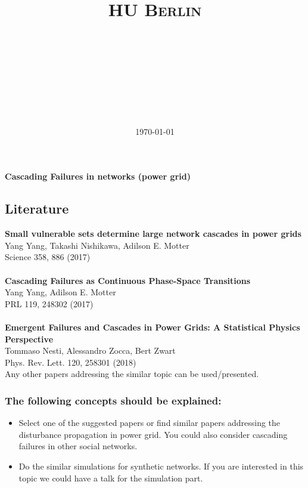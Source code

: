 \documentclass[a4paper,12pt]{article}
\title{
\vspace{2in}
\huge{\textsc{HU Berlin}\\\vspace{0.3cm}\hmwkClass}\\
\horrule{0.5pt} \\[0.4cm] %
\huge{\textmd{\textbf{\ \hmwkTitle}}}\\
\horrule{2pt} \\[0.5cm] %
\vspace{3in}
}
\author{\Large{\textbf{\hmwkAuthorName}}}
\date{\today} %
\newcommand{\hmwkTitle}{Cascading Failures in networks (power grid)} %
\newcommand{\hmwkDueDate}{} %
\begin{document}



\vspace*{1mm}
\begin{center}
    {\LARGE\textbf{\hmwkTitle}}\\
   \hmwkDueDate
\end{center}

\subsection*{Literature}
\textbf{Small vulnerable sets determine large network cascades in power grids}\\
Yang Yang, Takashi Nishikawa, Adilson E. Motter\\
Science 358, 886 (2017)\\
\\
\textbf{Cascading Failures as Continuous Phase-Space Transitions}\\
Yang Yang, Adilson E. Motter\\
PRL 119, 248302 (2017)\\
\\
\textbf{Emergent Failures and Cascades in Power Grids: A Statistical Physics Perspective}\\
Tommaso Nesti, Alessandro Zocca, Bert Zwart\\
Phys. Rev. Lett. 120, 258301 (2018) \\

Any other papers addressing the similar topic can be used/presented.

\subsubsection*{The following concepts should be explained:}
\small{
\begin{itemize}
\item Select one of the suggested papers or find similar papers addressing the disturbance propagation in power grid. You could also consider cascading failures in other social networks.
\item Do the similar simulations for synthetic networks. If you are interested in this topic we could have a talk for the simulation part.
\end{itemize}}
\end{document}
